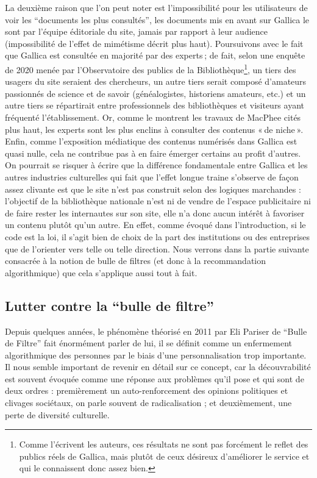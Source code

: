 La deuxième raison que l’on peut noter est l’impossibilité pour les utilisateurs de voir les \enquote{documents les plus consultés}, les documents mis en avant sur Gallica le sont par l’équipe éditoriale du site, jamais par rapport à leur audience (impossibilité de l’effet de mimétisme décrit plus haut). Poursuivons avec le fait que Gallica est consultée en majorité par des experts ; de fait, selon une enquête de 2020 menée par l’Observatoire des publics de la Bibliothèque\footnote{ Comme l’écrivent les auteurs, ces résultats ne sont pas forcément le reflet des publics réels de Gallica, mais plutôt de ceux désireux d’améliorer le service et qui le connaissent donc assez bien.}, un tiers des usagers du site seraient des chercheurs, un autre tiers serait composé d’amateurs passionnés de science et de savoir (généalogistes, historiens amateurs, etc.) et un autre tiers se répartirait entre professionnels des bibliothèques et visiteurs ayant fréquenté l’établissement. Or, comme le montrent les travaux de MacPhee cités plus haut, les experts sont les plus enclins à consulter des contenus « de niche ». Enfin, comme l’exposition médiatique des contenus numérisés dans Gallica est quasi nulle, cela ne contribue pas à en faire émerger certains au profit d’autres. On pourrait se risquer à écrire que la différence fondamentale entre Gallica et les autres industries culturelles qui fait que l’effet longue traine s’observe de façon assez clivante est que le site n’est pas construit selon des logiques marchandes : l’objectif de la bibliothèque nationale n’est ni de vendre de l’espace publicitaire ni de faire rester les internautes sur son site, elle n’a donc aucun intérêt à favoriser un contenu plutôt qu’un autre. En effet, comme évoqué dans l’introduction, si le code est la loi, il s’agit bien de choix de la part des institutions ou des entreprises que de l’orienter vers telle ou telle direction. Nous verrons dans la partie suivante consacrée à la notion de bulle de filtres (et donc à la recommandation algorithmique) que cela s’applique aussi tout à fait.

\subsection{Lutter contre la \enquote{bulle de filtre}}


Depuis quelques années, le phénomène théorisé en 2011 par Eli Pariser de \enquote{Bulle de Filtre} fait énormément parler de lui, il se définit comme un enfermement algorithmique des personnes par le biais d’une personnalisation trop importante. Il nous semble important de revenir en détail sur ce concept, car la découvrabilité est souvent évoquée comme une réponse aux problèmes qu’il pose et qui sont de deux ordres : premièrement un auto-renforcement des opinions politiques et clivages sociétaux, on parle souvent de radicalisation ; et deuxièmement, une perte de diversité culturelle.

